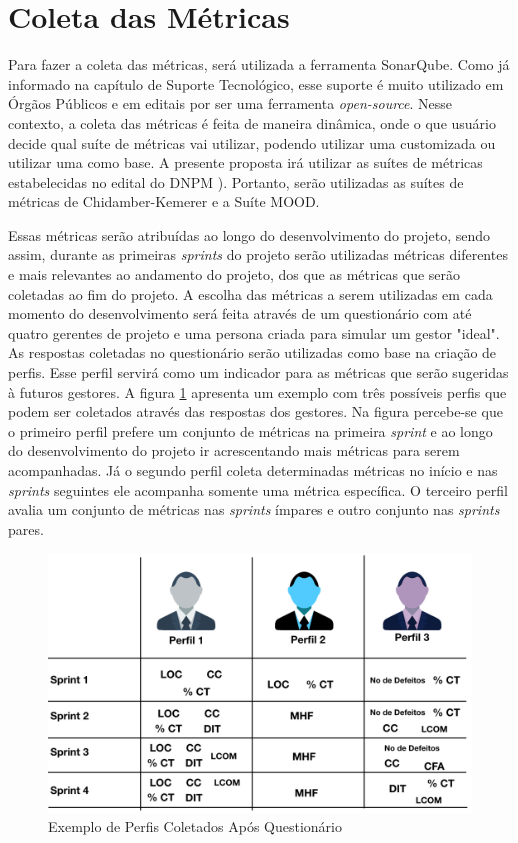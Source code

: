 \section{Coleta das Métricas}
Para fazer a coleta das métricas, será utilizada a ferramenta SonarQube. Como já informado na capítulo de Suporte Tecnológico, esse suporte é muito utilizado em Órgãos Públicos e em editais por ser uma ferramenta \textit{open-source}. Nesse contexto, a coleta das métricas é feita de maneira dinâmica, onde o que usuário decide qual suíte de métricas vai utilizar, podendo utilizar uma customizada ou utilizar uma como base. A presente proposta irá utilizar as suítes de métricas estabelecidas no edital do DNPM \cite{edital}). Portanto, serão utilizadas as suítes de métricas de Chidamber-Kemerer e a Suíte MOOD.

Essas métricas serão atribuídas ao longo do desenvolvimento do projeto, sendo assim, durante as primeiras \textit{sprints} do projeto serão utilizadas métricas diferentes e mais relevantes ao andamento do projeto, dos que as métricas que serão coletadas ao fim do projeto. A escolha das métricas a serem utilizadas em cada momento do desenvolvimento será feita através de um questionário com até quatro gerentes de projeto e uma persona criada para simular um gestor "ideal". As respostas coletadas no questionário serão utilizadas como base na criação de perfis. Esse perfil servirá como um indicador para as métricas que serão sugeridas à futuros gestores. A figura \ref{img:perfis} apresenta um exemplo com três possíveis perfis que podem ser coletados através das respostas dos gestores. Na figura percebe-se que o primeiro perfil prefere um conjunto de métricas na primeira \textit{sprint} e ao longo do desenvolvimento do projeto ir acrescentando mais métricas para serem acompanhadas. Já o segundo perfil coleta determinadas métricas no início e nas \textit{sprints} seguintes ele acompanha somente uma métrica específica. O terceiro perfil avalia um conjunto de métricas nas \textit{sprints} ímpares e outro conjunto nas \textit{sprints} pares.

\graphicspath{{figuras/}}
\begin{figure}[h!]
\centering
\includegraphics[scale=0.70]{perfis_exemplo.png}
\caption{Exemplo de Perfis Coletados Após Questionário}
\label{img:perfis}
\end{figure}


